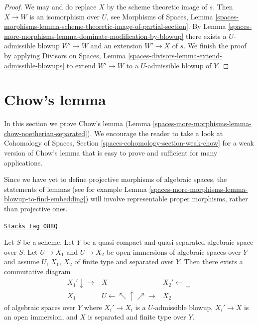 \begin{proof}
We may and do replace $X$ by the scheme theoretic image of $s$.
Then $X \to W$ is an isomorphism over $U$, see
Morphisms of Spaces, Lemma
\ref{spaces-morphisms-lemma-scheme-theoretic-image-of-partial-section}.
By Lemma \ref{spaces-more-morphisms-lemma-dominate-modification-by-blowup}
there exists a $U$-admissible blowup $W' \to W$ and an
extension $W' \to X$ of $s$.
We finish the proof by applying
Divisors on Spaces, Lemma \ref{spaces-divisors-lemma-extend-admissible-blowups}
to extend $W' \to W$ to a $U$-admissible blowup of $Y$.
\end{proof}

\section{Chow's lemma}
\label{spaces-more-morphisms-section-chow}
In this section we prove Chow's lemma
(Lemma \ref{spaces-more-morphisms-lemma-chow-noetherian-separated}).
We encourage the reader to take a look at
Cohomology of Spaces, Section \ref{spaces-cohomology-section-weak-chow}
for a weak version of Chow's lemma that is easy to prove and sufficient
for many applications.

\medskip\noindent
Since we have yet to define projective morphisms of algebraic spaces,
the statements of lemmas (see for example
Lemma \ref{spaces-more-morphisms-lemma-blowup-to-find-embedding}) will
involve representable proper morphisms, rather than projective ones.

\begin{lemma}
\label{spaces-more-morphisms-lemma-find-common-blowups}
\href{https://stacks.math.columbia.edu/tag/088Q}{\texttt{Stacks tag 088Q}}

Let $S$ be a scheme. Let $Y$ be a quasi-compact and quasi-separated
algebraic space over $S$. Let $U \to X_1$ and $U \to X_2$ be open immersions
of algebraic spaces over $Y$ and assume $U$, $X_1$, $X_2$ of finite
type and separated over $Y$. Then there exists a commutative diagram
$$
\begin{array}{ccc}X_1' \downarrow\longrightarrow & X & X_2' \longleftarrow\downarrow \\ X_1 & U \longleftarrow\nwarrow\uparrow\nearrow\longrightarrow & X_2\end{array}
$$
of algebraic spaces over $Y$ where $X_i' \to X_i$ is a $U$-admissible
blowup, $X_i' \to X$ is an open immersion, and $X$ is separated and finite
type over $Y$.
\end{lemma}

